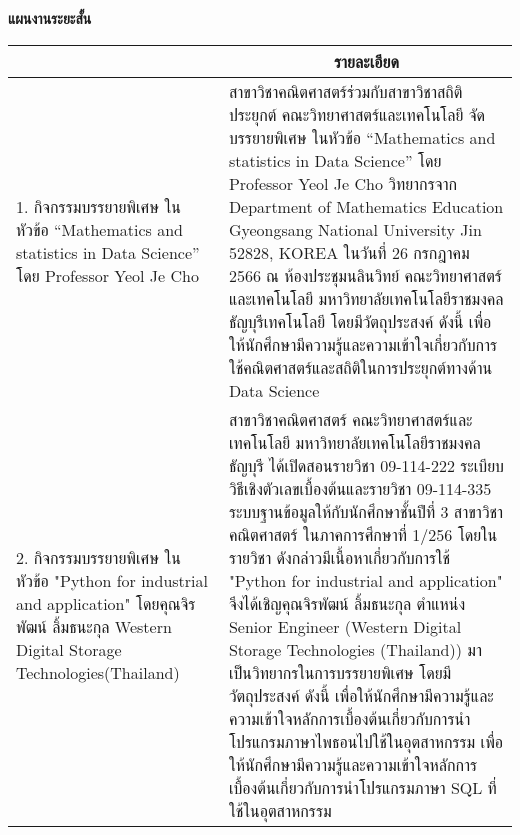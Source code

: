 \noindent
\textbf{แผนงานระยะสั้น}
\begin{longtable}{ |>{\raggedright}p{3cm}|p{10.5cm}|} 
\hline
\centering{\textbf{กิจกรรม}}   &\multicolumn{1}{c|}{\textbf{รายละเอียด}} \\ \hline
\endhead
1. กิจกรรมบรรยายพิเศษ ในหัวข้อ “Mathematics and statistics in Data Science” โดย Professor Yeol Je Cho   & สาขาวิชาคณิตศาสตร์ร่วมกับสาขาวิชาสถิติประยุกต์ คณะวิทยาศาสตร์และเทคโนโลยี จัดบรรยายพิเศษ ในหัวข้อ “Mathematics and statistics in Data Science” โดย Professor Yeol Je Cho วิทยากรจาก Department of Mathematics Education Gyeongsang National University Jin 52828, KOREA ในวันที่ 26 กรกฎาคม 2566 ณ ห้องประชุมนลินวิทย์ คณะวิทยาศาสตร์และเทคโนโลยี มหาวิทยาลัยเทคโนโลยีราชมงคลธัญบุรีเทคโนโลยี
โดยมีวัตถุประสงค์ ดังนี้ เพื่อให้นักศึกษามีความรู้และความเข้าใจเกี่ยวกับการใช้คณิตศาสตร์และสถิติในการประยุกต์ทางด้าน Data Science
\\ 
\hline
2. กิจกรรมบรรยายพิเศษ ในหัวข้อ "Python for industrial and application" โดยคุณจิรพัฒน์  ลิ้มธนะกุล Western Digital Storage Technologies\newline (Thailand) &   สาขาวิชาคณิตศาสตร์ คณะวิทยาศาสตร์และเทคโนโลยี มหาวิทยาลัยเทคโนโลยีราชมงคลธัญบุรี ได้เปิดสอนรายวิชา 09-114-222 ระเบียบวิธีเชิงตัวเลขเบื้องต้นและรายวิชา 09-114-335 ระบบฐานข้อมูลให้กับนักศึกษาชั้นปีที่ 3 สาขาวิชาคณิตศาสตร์ ในภาคการศึกษาที่ 1/256 โดยในรายวิชา ดังกล่าวมีเนื้อหาเกี่ยวกับการใช้ "Python for industrial and application" จึงได้เชิญคุณจิรพัฒน์  ลิ้มธนะกุล ตำแหน่ง Senior Engineer (Western Digital Storage Technologies (Thailand)) มาเป็นวิทยากรในการบรรยายพิเศษ โดยมีวัตถุประสงค์ ดังนี้ เพื่อให้นักศึกษามีความรู้และความเข้าใจหลักการเบื้องต้นเกี่ยวกับการนำโปรแกรมภาษาไพธอนไปใช้ในอุตสาหกรรม  เพื่อให้นักศึกษามีความรู้และความเข้าใจหลักการเบื้องต้นเกี่ยวกับการนำโปรแกรมภาษา SQL ที่ใช้ในอุตสาหกรรม
   \\ 
\hline
\end{longtable}

